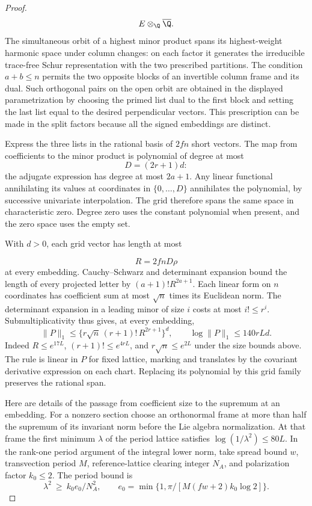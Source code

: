 \begin{proof}
\[
  E\otimes_{\Q}\overline{\Q}.
\]
 The simultaneous orbit of a highest
minor product spans its highest-weight harmonic space under column
changes: on each factor it generates the irreducible trace-free
Schur representation with the two prescribed partitions. The
condition \(a+b\le n\) permits the two opposite blocks of an
invertible column frame and its dual. Such orthogonal pairs on the
open orbit are obtained in the displayed parametrization by choosing
the primed list dual to the first block and setting the last list
equal to the desired perpendicular vectors. This prescription can
be made in the split factors because all the signed embeddings
are distinct.

Express the three lists in the rational basis of
\(2fn\) short vectors. The map from coefficients to the minor
product is polynomial of degree at most 
\[
  D=(2r+1)d:
\]
the adjugate expression has degree at most \(2a+1\). Any linear
functional annihilating its values at coordinates in
\(\{0,\ldots,D\}\) annihilates the polynomial, by successive
univariate interpolation. The grid therefore spans the same
space in characteristic zero. Degree zero uses the constant
polynomial when present, and the zero space uses the empty set.

With \(d>0\), each grid vector has length at most

\[
  R=2fnD\rho
\]
 at every embedding. Cauchy--Schwarz and determinant
expansion bound the length of every projected letter by
\((a+1)!R^{2a+1}\). Each linear form on \(n\) coordinates has
coefficient sum at most \(\sqrt n\) times its Euclidean norm.
The determinant expansion in a leading minor of size \(i\) costs
at most \(i!\le r^i\). Submultiplicativity thus gives, at every
embedding,
\[
 \|P\|_1\le\{r\sqrt n\,(r+1)!\,R^{2r+1}\}^{d},
 \qquad \log\|P\|_1\le140rLd .
\]
Indeed \(R\le e^{17L}\), \((r+1)!\le e^{4rL}\), and
\(r\sqrt n\le e^{2L}\) under the size bounds above. The rule is
linear in \(P\) for fixed lattice, marking and translates by the
covariant derivative expression on each chart. Replacing its
polynomial by this grid family preserves the rational span.
\label{cor:slice-short-heights-2}

Here are details of the passage from coefficient size to the
supremum at an embedding. For a nonzero section choose an
orthonormal frame at more than half the supremum of its invariant
norm before the Lie algebra normalization. At that frame the first
minimum \(\lambda\) of the period lattice satisfies
\(\log(1/\lambda^2)\le80L\).
In the rank-one period argument of the integral lower norm, take
spread bound \(w\), transvection period \(M\), reference-lattice
clearing integer \(N_A\), and polarization factor \(k_0\le2\).
The period bound is
\[
 \lambda^2\ \ge\ k_0 e_0/N_A^2,\qquad
 e_0=\min\{1,\pi/[M(fw+2)k_0\log 2]\}.
\]


\end{proof}
